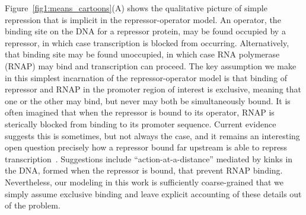 Figure~\ref{fig1:means_cartoons}(A) shows the qualitative picture of simple
repression that is implicit in the repressor-operator model. An operator, the
binding site on the DNA for a repressor protein, may be found occupied by a
repressor, in which case transcription is blocked from occurring. Alternatively,
that binding site may be found unoccupied, in which case RNA polymerase (RNAP)
may bind and transcription can proceed. The key assumption we make in this
simplest incarnation of the repressor-operator model is that binding of
repressor and RNAP in the promoter region of interest is exclusive, meaning that
one or the other may bind, but never may both be simultaneously bound. It is
often imagined that when the repressor is bound to its operator, RNAP is
sterically blocked from binding to its promoter sequence. Current evidence
suggests this is sometimes, but not always the case, and it remains an
interesting open question precisely how a repressor bound far upstream is able
to repress transcription~\cite{Rydenfelt2014-2}. Suggestions include
``action-at-a-distance'' mediated by kinks in the DNA, formed when the repressor
is bound, that prevent RNAP binding. Nevertheless, our modeling in this work is
sufficiently coarse-grained that we simply assume exclusive binding and leave
explicit accounting of these details out of the problem.

